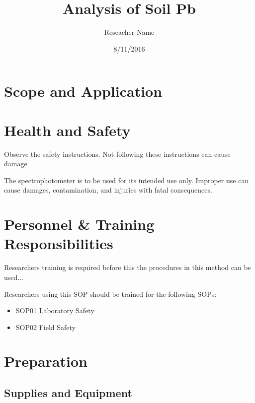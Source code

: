 \documentclass[12pt]{../SOP2}
\title{Analysis of Soil Pb}
\date{8/11/2016}
\author{Reseacher Name}
\begin{document}


\maketitle

\section{Scope and Application}

\NP \blindtext

\NP \lipsum[1]

\tableofcontents

\newpage

\section{Health and Safety}

\NP Observe the safety instructions. Not following these instructions can cause damage

\NP The spectrophotometer is to be used for its intended use only. Improper use can cause damages, contamination, and injuries with fatal consequences.


\section{Personnel \& Training Responsibilities}


\NP Researchers training is required before this the procedures in this method can be used... 

\NP Researchers using this SOP should be trained for the following SOPs:

\begin{itemize}
  \item SOP01 Laboratory Safety
  \item SOP02 Field Safety
\end{itemize}


\section{Preparation}

\subsection{Supplies and Equipment}
\end{document}
